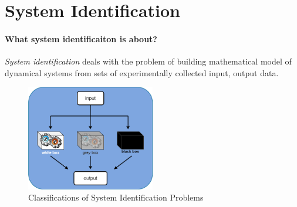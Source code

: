 \chapter{System Identification}    %
\subsubsection{What system identificaiton is about?}
\textit{System identification} deals with the problem of building mathematical model of dynamical systems from sets of experimentally collected input, output data.


\begin{figure}[htbp]
    \centering
    \includegraphics[width=0.5\textwidth]{images/system-id-scheme.png}
    \caption{Classifications of System Identification Problems}
    \label{fig:id_classes}
\end{figure}

